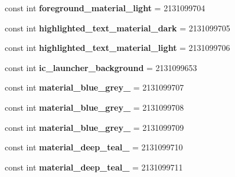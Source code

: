 \begin{DoxyCompactItemize}
const int {\bfseries foreground\+\_\+material\+\_\+light} = 2131099704
\item 
\mbox{\label{classst_delivery_1_1_resource_1_1_color_a48361eb359bd7c4a8bcc20171107ae07}} 
const int {\bfseries highlighted\+\_\+text\+\_\+material\+\_\+dark} = 2131099705
\item 
\mbox{\label{classst_delivery_1_1_resource_1_1_color_ae6ce1c13d45e7dbc9b078b0ad0db53c1}} 
const int {\bfseries highlighted\+\_\+text\+\_\+material\+\_\+light} = 2131099706
\item 
\mbox{\label{classst_delivery_1_1_resource_1_1_color_a9e1cc3370a1c5bde89b744936999dd46}} 
const int {\bfseries ic\+\_\+launcher\+\_\+background} = 2131099653
\item 
\mbox{\label{classst_delivery_1_1_resource_1_1_color_a3b85dc2f1e003fb5e48d23ed10b711cb}} 
const int {\bfseries material\+\_\+blue\+\_\+grey\+\_} = 2131099707
\item 
\mbox{\label{classst_delivery_1_1_resource_1_1_color_a6af55eaa905e12996a28088f6ce0f0cb}} 
const int {\bfseries material\+\_\+blue\+\_\+grey\+\_} = 2131099708
\item 
\mbox{\label{classst_delivery_1_1_resource_1_1_color_a8db8835ecc39195738fc16e268cdb72f}} 
const int {\bfseries material\+\_\+blue\+\_\+grey\+\_} = 2131099709
\item 
\mbox{\label{classst_delivery_1_1_resource_1_1_color_a85ff1b5ba97ea982d2e57da7c65e337f}} 
const int {\bfseries material\+\_\+deep\+\_\+teal\+\_} = 2131099710
\item 
\mbox{\label{classst_delivery_1_1_resource_1_1_color_a4e9c752b138e5782cc227f0350fb3c77}} 
const int {\bfseries material\+\_\+deep\+\_\+teal\+\_} = 2131099711
\item 
\mbox{\label{classst_delivery_1_1_resource_1_1_color_ac9d65a455b0db05094570ff2a3e0a726}} 

\end{DoxyCompactItemize}
